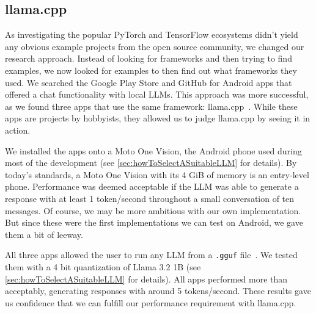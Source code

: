 \subsection{llama.cpp}
\label{sec:llamaCpp}
As investigating the popular PyTorch and TensorFlow ecosystems didn't yield any obvious example projects from the open source community, we changed our research approach. Instead of looking for frameworks and then trying to find examples, we now looked for examples to then find out what frameworks they used. We searched the Google Play Store and GitHub for Android apps that offered a chat functionality with local \glspl{LLM}. This approach was more successful, as we found three apps that use the same framework: llama.cpp~\cite{panchalShubham0204SmolChatAndroid2025,vali-98Vali98ChatterUI2025,ghorbaniAghorbaniPocketpalai2025}. While these apps are projects by hobbyists, they allowed us to judge llama.cpp by seeing it in action.

We installed the apps onto a Moto One Vision, the Android phone used during most of the development (see \cref{sec:howToSelectASuitableLLM} for details). By today's standards, a Moto One Vision with its 4 GiB of memory is an entry-level phone. Performance was deemed acceptable if the \gls{LLM} was able to generate a response with at least 1 token/second throughout a small conversation of ten messages. Of course, we may be more ambitious with our own implementation. But since these were the first implementations we can test on Android, we gave them a bit of leeway.

All three apps allowed the user to run any \gls{LLM} from a \lstinline|.gguf| file~\cite{panchalShubham0204SmolChatAndroid2025,vali-98Vali98ChatterUI2025,ghorbaniAghorbaniPocketpalai2025}. We tested them with a 4 bit quantization of Llama 3.2 1B (see \cref{sec:howToSelectASuitableLLM} for details). All apps performed more than acceptably, generating responses with around 5 tokens/second. These results gave us confidence that we can fulfill our performance requirement with llama.cpp.

